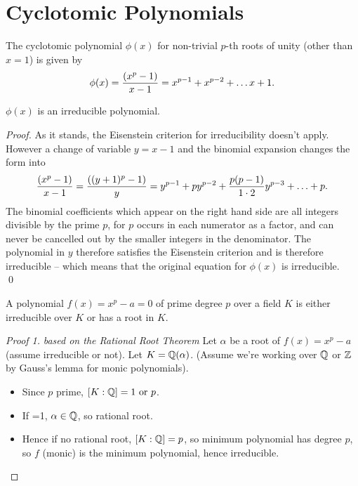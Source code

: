 \section{Cyclotomic Polynomials}

\begin{definition}
The cyclotomic polynomial $\phi(x)$ for non-trivial $p$-th roots of unity (other than $x = 1$) is given by
\[ \phi(x) = {(x^p - 1)\over x - 1} = x^{p-1} + x^{p - 2} + \hdots x + 1. \]
\end{definition}

\begin{theorem}
$\phi(x)$ is an irreducible polynomial.

\end{theorem}
\begin{proof} As it stands,  the Eisenstein criterion for irreducibility doesn't apply. 
However a change of variable $y = x - 1$ and the binomial expansion changes the form into 
\[ {(x^p - 1)\over x - 1}  = {((y+1)^p - 1)\over y}  = y^{p-1} + p y^{p-2} + {p(p-1)\over 1\cdot2} y^{p-3}  + \hdots + p.\]
The binomial coefficients which appear on the right hand side are all integers divisible by the prime $p$, for $p$ occurs in each numerator as a factor, and can never be cancelled out by the smaller integers in the denominator.
The polynomial in $y$ therefore satisfies the Eisenstein criterion and is therefore irreducible -- which means that the original equation for $\phi(x)$ is irreducible.  \qed
\end{proof}

\begin{theorem}[Irreducibility of $x^p - a = 0$]
A polynomial $f(x) = x^p - a = 0$  of prime degree $p$ over a field $K$ is either irreducible over $K$ or has a root in $K$.
\end{theorem}

\begin{proof}[Proof 1] {\it based on the Rational Root Theorem}
Let $\alpha$  be a root of $f(x) = x^p - a$ (assume irreducible or not). Let $K = \mathbb{Q}(\alpha)$.
(Assume we're working over $\mathbb{Q}$ or $\mathbb{Z}$ by Gauss's lemma for monic polynomials).
\begin{itemize}
\item[]Since $p$ prime, $[K:\mathbb{Q}] =1 \mbox{ or } p$.
\item[]If =1, $\alpha \in \mathbb{Q}$, so rational root.
\item[]Hence if no rational root, $[K:\mathbb{Q}]=p$, so minimum polynomial has degree $p$, so $f$ (monic) is the minimum polynomial, hence irreducible.
\end{itemize}
\end{proof}

